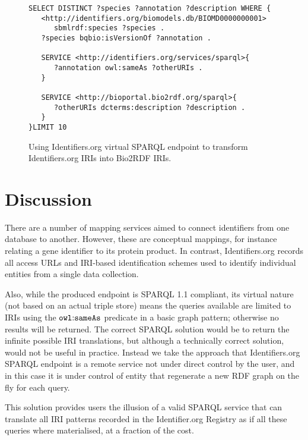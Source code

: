 \documentclass{bioinfo}
\begin{document}
\begin{figure}[h]
{\scriptsize
\begin{verbatim}
SELECT DISTINCT ?species ?annotation ?description WHERE { 
   <http://identifiers.org/biomodels.db/BIOMD0000000001> 
      sbmlrdf:species ?species . 
   ?species bqbio:isVersionOf ?annotation .
   
   SERVICE <http://identifiers.org/services/sparql>{
      ?annotation owl:sameAs ?otherURIs .
   }
   
   SERVICE <http://bioportal.bio2rdf.org/sparql>{
      ?otherURIs dcterms:description ?description .
   }        
}LIMIT 10
\end{verbatim}
}
  \caption{Using Identifiers.org virtual SPARQL endpoint to transform Identifiers.org IRIs into Bio2RDF IRIs.}
  \label{translatestuff}
\end{figure}

\section{Discussion}
There are a number of mapping services aimed to connect identifiers from one database to another. However, these are conceptual mappings, for instance relating a gene identifier to its protein product. In contrast, Identifiers.org records all access URLs and IRI-based identification schemes used to identify individual entities from a single data collection.

Also, while the produced endpoint is SPARQL 1.1 compliant, its virtual nature (not based on an actual triple store) means the queries available are limited to IRIs using the $\mathtt{owl\text{\rm :}{}sameAs}$ predicate in a basic graph pattern; otherwise no results will be returned. The correct SPARQL solution would be to return the infinite possible IRI translations, but although a technically correct solution, would not be useful in practice. Instead we take the approach that Identifiers.org SPARQL endpoint is a remote service not under direct control by the user, and in this case it is under control of entity that regenerate a new RDF graph on the fly for each query.

This solution provides users the illusion of a valid SPARQL service that can translate all IRI patterns recorded in the Identifier.org Registry as if all these queries where materialised, at a fraction of the cost.
\end{document}
